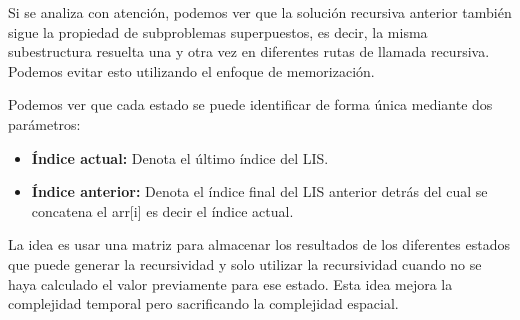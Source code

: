 Si se analiza con atención, podemos ver que la solución recursiva anterior también sigue la propiedad de subproblemas superpuestos, es decir, la misma subestructura resuelta una y otra vez en diferentes rutas de llamada recursiva. Podemos evitar esto utilizando el enfoque de memorización.

Podemos ver que cada estado se puede identificar de forma única mediante dos parámetros:

\begin{itemize}
	\item \textbf{Índice actual:} Denota el último índice del LIS.
	\item \textbf{Índice anterior:} Denota el índice final del LIS anterior detrás del cual se concatena el arr[i] es decir el índice actual.
\end{itemize}

La idea es usar una matriz para almacenar los resultados de los diferentes estados que puede generar la recursividad y solo utilizar la recursividad cuando no se haya calculado el valor previamente para ese estado. Esta idea mejora la complejidad temporal pero sacrificando la complejidad espacial.   